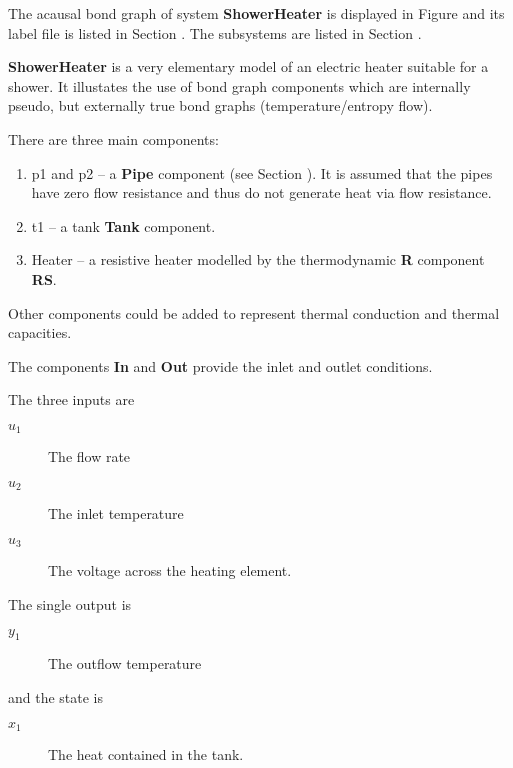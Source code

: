

   The acausal bond graph of system \textbf{ShowerHeater} is
   displayed in Figure  and its label
   file is listed in Section .
   The subsystems are listed in Section .

\textbf{ShowerHeater} is a very elementary model of an electric heater suitable for
a shower. It illustates the use of bond graph components which are
internally pseudo, but externally true bond graphs
(temperature/entropy flow).

There are three main components:
\begin{enumerate}
\item p1 and p2 -- a \textbf{Pipe} component (see Section
  ). It is assumed that the pipes have zero flow
  resistance and thus do not generate heat via flow resistance.
\item t1 -- a tank \textbf{Tank} component. 
\item Heater -- a resistive heater modelled by the thermodynamic
  \textbf{R} component \textbf{RS}.
\end{enumerate}
Other components could be added to represent thermal conduction and
thermal capacities.

The components \textbf{In} and \textbf{Out} provide the inlet and
outlet conditions.

The three inputs are
\begin{description}
\item[$u_1$] The flow rate
\item[$u_2$] The inlet temperature
\item[$u_3$] The voltage across the heating element.
\end{description}
The single output is
\begin{description}
\item[$y_1$] The outflow temperature
\end{description}
and the state is 
\begin{description}
\item[$x_1$] The heat contained in the tank.
\end{description}

